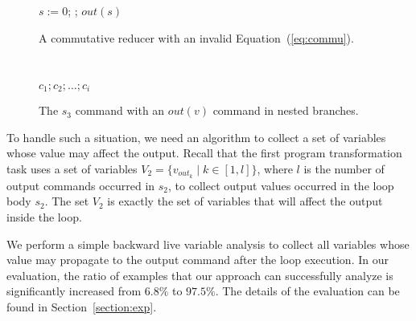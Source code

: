 \documentclass{llncs}
\newcommand{\cur}{cur()}
\begin{document}
\begin{figure}[hbt]
	\begin{minipage}{0.4\textwidth}
		\begin{algorithm}[H]
			$s:= 0$; \;
			\Loop{}{
				$t:=\cur$;
				$s:= s + t$\;
			};
			$out(s)$\;\;\;
		\end{algorithm}
		\caption{A commutative reducer with an invalid Equation~(\ref{eq:commu}).}
		\label{fig:reducer_opt}
	\end{minipage}
	\ \ \ \ \ \ \ \
	\begin{minipage}{0.5\textwidth}
		\LinesNumbered
		\centering
		\begin{minipage}{0.75\textwidth}
		\begin{algorithm}[H]
			$c_1;c_2;\ldots;c_i$\;
			\lElse{ $\ldots$}
		\end{algorithm}
	\end{minipage}
		\caption{The $s_3$ command with an $out(v)$ command in nested branches.}
		\label{fig:nested_out}
	\end{minipage}
\end{figure}


To handle such a situation, we need an algorithm to collect a set of variables whose value may affect the output.
Recall that the first program transformation task uses a set of variables $V_2=\{v_{out_k} \mid k \in [1,l]\}$, where $l$ is the number of output commands occurred in $s_2$, to collect output values occurred in the loop body $s_2$.
The set $V_2$ is exactly the set of variables that will affect the output inside the loop.

We perform a simple backward live variable analysis to collect all variables whose value may propagate to the output command after the loop execution. In our evaluation, the ratio of examples that our approach can successfully analyze is significantly increased from $6.8\%$ to $97.5\%$. The details of the evaluation can be found in Section~\ref{section:exp}.
\end{document}
